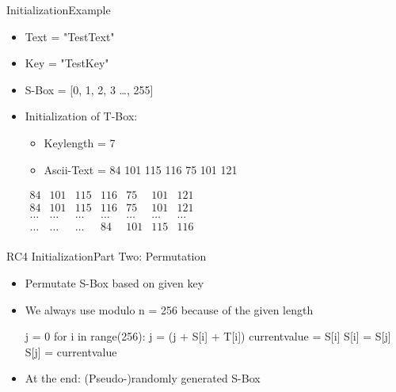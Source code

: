\documentclass[
	aspectratio=169,	%
	onlytextwidth,		%
	t,					%
	]{beamer}
\begin{document}
\begin{frame}{Initialization}{Example}
	\begin{itemize}
		\item Text = "TestText"
		\item Key = "TestKey"
		\item S-Box = [0, 1, 2, 3 \dots, 255]
		\item Initialization of T-Box:
		\begin{itemize}
			\item Keylength = 7
			\item Ascii-Text = 84 101 115 116 75 101 121
		\end{itemize}
		\medskip
		$\begin{array}{|ccccccc|}
		84 & 101 & 115 & 116 & 75 & 101 & 121 \\
		84 & 101 & 115 & 116 & 75 & 101 & 121 \\
		\dots & \dots & \dots & \dots & \dots & \dots & \dots \\
		\dots & \dots & \dots & 84 & 101 & 115 & 116 \\
		\end{array}$
	\end{itemize}
\end{frame}


\begin{frame}[fragile]{RC4 Initialization}{Part Two: Permutation}
	\begin{itemize}
		\item Permutate S-Box based on given key
		\item We always use modulo n = 256 because of the given length

		\begin{python}
			j = 0
			for i in range(256):
				j = (j + S[i] + T[i]) %
				currentvalue = S[i]
				S[i] = S[j]
				S[j] = currentvalue
		\end{python}
		\item At the end: (Pseudo-)randomly generated S-Box
		
	\end{itemize}
\end{frame}
\end{document}
